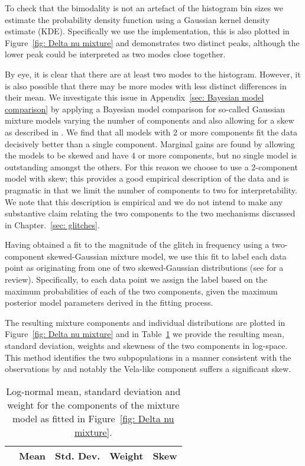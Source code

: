 \documentclass[../full_thesis/full_thesis.tex]{subfiles}
\newcommand{\thisdir}{../glitches_in_CGW}
\begin{document}
To check that the bimodality is not an artefact of the histogram bin sizes we
estimate the probability density function using a Gaussian kernel density
estimate (KDE). Specifically we use the \citet{Scipy} implementation, this is
also plotted in Figure~\ref{fig: Delta nu mixture} and demonstrates two distinct
peaks, although the lower peak could be interpreted as two modes close together.

By eye, it is clear that there are at least two modes to the histogram. However,
it is also possible that there may be more modes with less distinct differences
in their mean. We investigate this issue in Appendix~\ref{sec: Bayesian model
comparison} by applying a Bayesian model comparison for so-called Gaussian
mixture models varying the number of components and also allowing for a skew as
described in \citet{Ohagan1976}.  We find that all models with 2 or more
components fit the data decisively better than a single component. Marginal
gains are found by allowing the models to be skewed and have 4 or more
components, but no single model is outstanding amongst the others. For this
reason we choose to use a 2-component model with skew; this provides a good
empirical description of the data and is pragmatic in that we limit the number
of components to two for interpretability. We note that this description is
empirical and we do not intend to make any substantive claim relating the two
components to the two mechanisms discussed in Chapter.~\ref{sec: glitches}.

Having obtained a fit to the magnitude of the glitch in frequency using a
two-component skewed-Gaussian mixture model, we use this fit to label
each data point as originating from one of two skewed-Gaussian distributions
(see \citet{gelman2013bayesian} for a review). Specifically, to each data point
we assign the label based on the maximum probabilities of each of the two
components, given the maximum posterior model parameters derived in the fitting
process.

The resulting mixture components and individual
distributions are plotted in Figure~\ref{fig: Delta nu mixture} and in
Table~\ref{tab: mixture components} we provide the resulting mean, standard
deviation, weights and skewness of the two components in log-space.
This method identifies the two subpopulations in a manner consistent with the
observations by \citet{Espinoza2011} and notably the Vela-like component suffers
a significant skew.

\begin{table}[htb]
\begin{tabular}{lcccc}
& Mean &Std. Dev. & Weight & Skew \\ \hline

\end{tabular}
\caption{Log-normal mean, standard deviation and weight for the components of
the mixture model as fitted in Figure~\ref{fig: Delta nu mixture}.}
\label{tab: mixture components}
\end{table}
\end{document}
